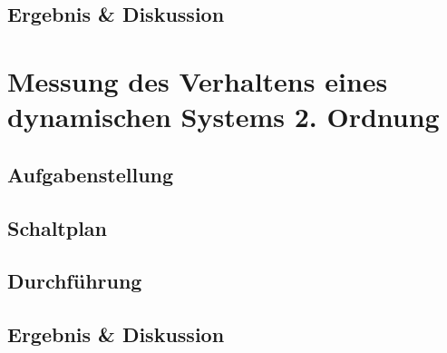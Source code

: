\documentclass[12pt,a4paper,titlepage]{article}
\begin{document}
\subsection{Ergebnis & Diskussion}

\section{Messung des Verhaltens eines dynamischen Systems 2. Ordnung}

\subsection{Aufgabenstellung}

\subsection{Schaltplan}

\subsection{Durchführung}

\subsection{Ergebnis & Diskussion}
\end{document}
